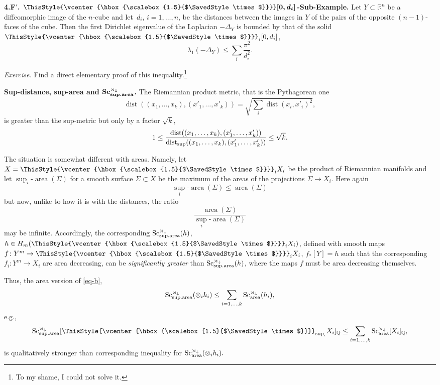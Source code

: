 \documentclass[pdftex]{sigma}
\numberwithin{equation}{section}
\newcommand\bigtimes{\mathbin{\ThisStyle{\vcenter{\hbox{%
\scalebox{1.5}{$\SavedStyle\times$}}}}}}
\begin{document}
\textbf{4.F$'$. $\boldsymbol{\bigtimes [0,d_i]}$-Sub-Example.} Let $Y\subset\mathbb R^n$ be a diffeomorphic image
 of the $n$-cube and let~$d_i$, $ i=1,\dots,n$, be the distances between
 the images in $Y$ of the pairs of the opposite $(n-1)$-faces of the cube.
Then the first Dirichlet eigenvalue of the Laplacian $-\Delta_Y$
is bounded by that of the solid $\bigtimes_i [0,d_i]$,
\[
\lambda_1(-\Delta_Y)\leq \sum_i\frac{\pi^2}{d^2_i}.
\]

{\it Exercise.} Find a direct elementary proof of this inequality.\footnote{To my shame, I could not solve it.}

\textbf{Sup-distance, sup-area and $\boldsymbol{\operatorname{Sc}_{\rm sup.area}^{\rtimes_\downarrow}}$.} The Riemannian product metric, that is the Pythagorean one
\[
\operatorname{dist}((x_1,\dots,x_k), (x'_1,\dots,x'_k))=\sqrt{ \sum_i\operatorname{dist}(x_i, x'_i)^2},
\]
 is greater than the sup-metric but only by a factor $ \sqrt k$,
\[
1\leq {\operatorname{dist}((x_1,\dots,x_k), (x'_1,\dots,x'_k))\over \operatorname{dist}_{\sup}((x_1,\dots,x_k), (x'_1,\dots,x'_k))}\leq \sqrt k.
\]

The situation is somewhat different with areas. Namely, let $X=\bigtimes_iX_i$
 be the product of Riemannian manifolds and let
 $\sup_i$-$\operatorname{area}(\Sigma)$ for a smooth surface $\Sigma\subset X$ be the maximum of the areas of the projections $\Sigma\to X_i$.
 Here again
 \[
 {\sup_i}\mbox{-}{\operatorname{area}}(\Sigma)\leq \operatorname{area}(\Sigma)
 \]
 but now, unlike to how it is with the distances, the ratio
\[
\frac{\operatorname{area}(\Sigma)}{{\sup_i}\mbox{-}{\operatorname{area}}(\Sigma)}
\]
 may be infinite.
 Accordingly, the corresponding $\operatorname{Sc}_{{\rm sup.area}}^{\rtimes_\downarrow}(h)$,
 $h\in H_m(
 \bigtimes_iX_i)$, defined with smooth maps $f\colon Y^m\to \bigtimes_iX_i$,
 $f_\ast[Y]=h$ such that the corresponding $f_i\colon Y^m\to X_i$ are area decreasing, can be {\it significantly greater}
 than $\operatorname{Sc}_{{\rm sup.area}}^{\rtimes_\downarrow}(h)$, where the maps $f$ must be area decreasing themselves.

 Thus, the area version of \eqref{eq-b},
\begin{equation}\label{eq-c}
\operatorname{Sc}_{\rm sup.area}^{\rtimes_\downarrow}( \otimes_i h_i)\leq\sum_{i=1,\dots,k} \operatorname{Sc}_{\rm area}^{\rtimes_\downarrow}( h_i ),
\end{equation}
 e.g.,
 \[
 \operatorname{Sc}_{\rm sup.area}^{\rtimes_\downarrow}[ \bigtimes_{\sup_i} X_i]_{\mathbb Q}\leq\sum_{i=1,\dots,k} \operatorname{Sc}_{\rm area}^{\rtimes_\downarrow} [X_i]_{\mathbb Q},
 \]
is qualitatively stronger than corresponding inequality for $\operatorname{Sc}_{\rm area}^{\rtimes_\downarrow}( \otimes_i h_i).$
\end{document}

